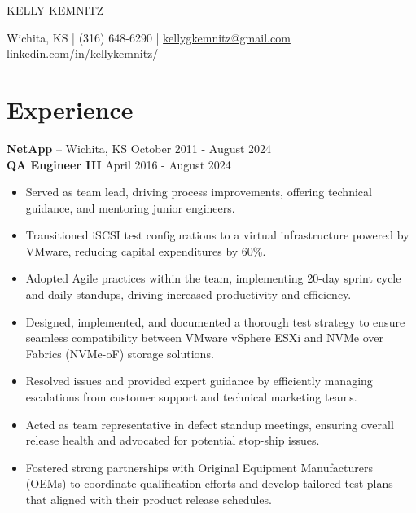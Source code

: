 \documentclass[11pt]{article}       %
\begin{document}
\centerline{\Huge KELLY KEMNITZ}

\vspace{5pt}

\centerline{Wichita, KS | (316) 648-6290 | \href{mailto:kellygkemnitz@gmail.com}{kellygkemnitz@gmail.com} | \href{https://www.linkedin.com/in/kellykemnitz/}{linkedin.com/in/kellykemnitz/}}

\vspace{-10pt}

\section*{Experience}
\textbf{NetApp} -- Wichita, KS \hfill October 2011 - August 2024 \\
\textbf{QA Engineer III} \hfill April 2016 - August 2024 \\
\vspace{-9pt}
\begin{itemize}
  \item Served as team lead, driving process improvements, offering technical guidance, and mentoring junior engineers.
  \item Transitioned iSCSI test configurations to a virtual infrastructure powered by VMware, reducing capital expenditures by 60\%.
  \item Adopted Agile practices within the team, implementing 20-day sprint cycle and daily standups, driving increased productivity and efficiency.
  \item Designed, implemented, and documented a thorough test strategy to ensure seamless compatibility between VMware vSphere ESXi and NVMe over Fabrics (NVMe-oF) storage solutions.
  \item Resolved issues and provided expert guidance by efficiently managing escalations from customer support and technical marketing teams.
  \item Acted as team representative in defect standup meetings, ensuring overall release health and advocated for potential stop-ship issues.
  \item Fostered strong partnerships with Original Equipment Manufacturers (OEMs) to coordinate qualification efforts and develop tailored test plans that aligned with their product release schedules.
\end{itemize}
\end{document}

